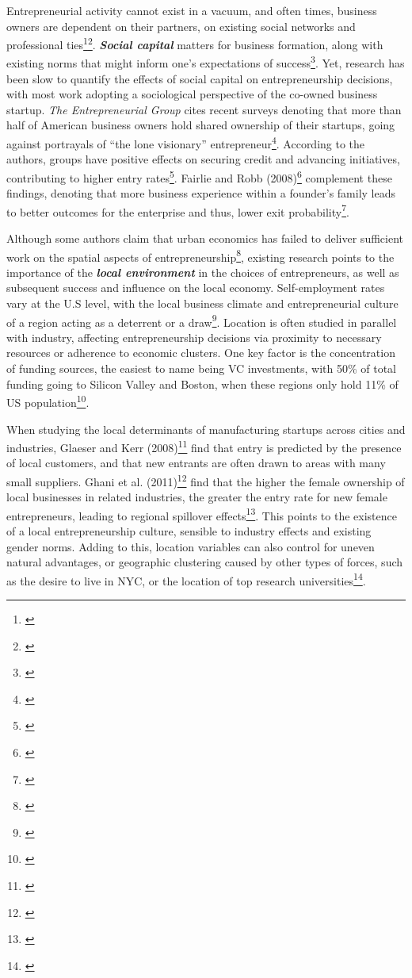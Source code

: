 Entrepreneurial activity cannot exist in a vacuum, and often times, business owners are dependent on their partners, on existing social networks and professional ties\footnote{\cite{Lerner2009}}\hspace{.15em}\footnote{\cite[Page~74]{Parker2004}}. \textbf{\textit{Social capital}} matters for business formation, along with existing norms that might inform one's expectations of success\footnote{\cite{Lerner2009}}. Yet, research has been slow to quantify the effects of social capital on entrepreneurship decisions, with most work adopting a sociological perspective of the co-owned business startup. \textit{The Entrepreneurial Group} cites recent surveys denoting that more than half of American business owners hold shared ownership of their startups, going against portrayals of ``the lone visionary'' entrepreneur\footnote{\cite{Ruef2010}}. According to the authors, groups have positive effects on securing credit and advancing initiatives, contributing to higher entry rates\footnote{\cite{Ruef2010}}. Fairlie and Robb (2008)\footnote{\cite{FairlieRobb2008}} complement these findings, denoting that more business experience within a founder’s family leads to better outcomes for the enterprise and thus, lower exit probability\footnote{\cite{FairlieRobb2008}}. 


Although some authors claim that urban economics has failed to deliver sufficient work on the spatial aspects of entrepreneurship\footnote{\cite{GlaeserRosenthalStrange2009}}, existing research points to the importance of the \textbf{\textit{local environment}} in the choices of entrepreneurs, as well as subsequent success and influence on the local economy. Self-employment rates vary at the U.S level, with the local business climate and entrepreneurial culture of a region acting as a deterrent or a draw\footnote{\cite{PatrickStephensWeinstein2016}}. Location is often studied in parallel with industry, affecting entrepreneurship decisions via proximity to necessary resources or adherence to economic clusters. One key factor is the concentration of funding sources, the easiest to name being VC investments, with 50\% of total funding going to Silicon Valley and Boston, when these regions only hold 11\% of US population\footnote{\cite{ChatterjiGlaeserKerr2014}}. 

When studying the local determinants of manufacturing startups across cities and industries, Glaeser and Kerr (2008)\footnote{\cite{GlaeserKerr2008}} find that entry is predicted by the presence of local customers, and that new entrants are often drawn to areas with many small suppliers. Ghani et al. (2011)\footnote{\cite{GhaniKerrOConnell2011}} find that the higher the female ownership of local businesses in related industries, the greater the entry rate for new female entrepreneurs, leading to regional spillover effects\footnote{\cite{GhaniKerrOConnell2011}}. This points to the existence of a local entrepreneurship culture, sensible to industry effects and existing gender norms. Adding to this, location variables can also control for uneven natural advantages, or geographic clustering caused by other types of forces, such as the desire to live in NYC, or the location of top research universities\footnote{\cite{ChatterjiGlaeserKerr2014}}. 


